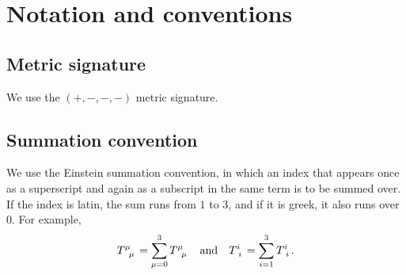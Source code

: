 \chapter*{Notation and conventions} %

\section*{Metric signature}

We use the $(+,-,-,-)$ metric signature.

\section*{Summation convention}

We use the Einstein summation convention, in which an index that appears once as a superscript and again as a subscript in the same term is to be summed over.
If the index is latin, the sum runs from $1$ to $3$, and if it is greek, it also runs over $0$.
For example,
\begin{equation*}
	T\indices{^\mu_\mu} = \sum_{\mu=0}^3 T\indices{^\mu_\mu}
	\quad \text{and} \quad
	T\indices{^i_i} = \sum_{i=1}^3 T\indices{^i_i}
	.
\end{equation*}

\iffalse
\section*{Fourier transformation}

We use the Fourier transformation convention
\begin{equation}
	f(k) = \int \dif x \, e^{i k x} f(x)
	\qquad \text{and} \qquad
	f(x) = \int \frac{\dif k}{2 \pi} \, e^{-i k x} f(k) .
\end{equation}
With this convention, the delta function $\delta(x' - x)$ is given by the highlighted part of
\begin{equation}
	f(x) = \int \frac{\dif k}{2 \pi} \, e^{-i k x} f(k)
	     = \int \dif x' \underbrace{\int \frac{\dif k}{2 \pi} \, e^{i k (x'-x)}}_{\displaystyle \delta(x'-x)} f(k) .
\label{eq:pre:delta_function}
\end{equation}
\fi
